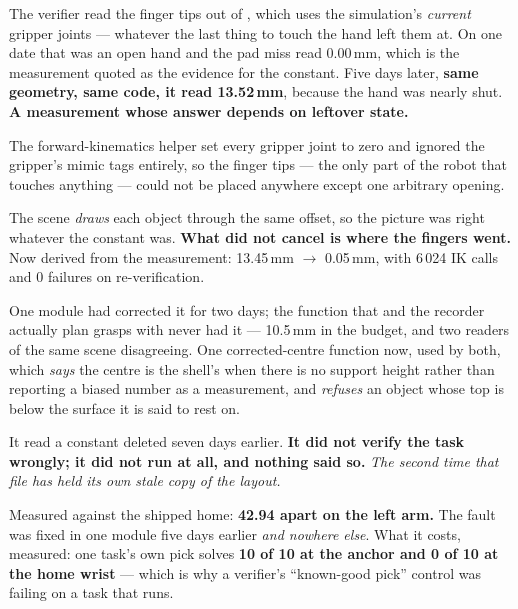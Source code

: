 {The verifier read the finger tips out of , which uses the
simulation's \emph{current} gripper joints --- whatever the last thing to touch
the hand left them at. On one date that was an open hand and the pad miss read
0.00\,mm, which is the measurement quoted as the evidence for the constant. Five
days later, \textbf{same geometry, same code, it read 13.52\,mm}, because the
hand was nearly shut. \textbf{A measurement whose answer depends on leftover
state.}}

{The forward-kinematics helper set every gripper joint to zero and ignored the
gripper's mimic tags entirely, so the finger tips --- the only part of the robot
that touches anything --- could not be placed anywhere except one arbitrary
opening.}

{The scene \emph{draws} each object through the same offset, so the picture was
right whatever the constant was. \textbf{What did not cancel is where the fingers
went.} Now derived from the measurement: 13.45\,mm $\rightarrow$ 0.05\,mm, with
6\,024 IK calls and 0 failures on re-verification.}

{One module had corrected it for two days; the function that
 and the recorder actually plan grasps with never had it ---
10.5\,mm in the budget, and two readers of the same scene disagreeing. One
corrected-centre function now, used by both, which \emph{says} the centre is the
shell's when there is no support height rather than reporting a biased number as
a measurement, and \emph{refuses} an object whose top is below the surface it is
said to rest on.}

{It read a constant deleted seven days earlier. \textbf{It did not verify the
task wrongly; it did not run at all, and nothing said so.} \emph{The second time
that file has held its own stale copy of the layout.}}

{Measured against the shipped home: \textbf{42.94\dg{} apart on the left arm.}
The fault was fixed in one module five days earlier \emph{and nowhere else}.
What it costs, measured: one task's own pick solves \textbf{10 of 10 at the
anchor and 0 of 10 at the home wrist} --- which is why a verifier's ``known-good
pick'' control was failing on a task that runs.}

